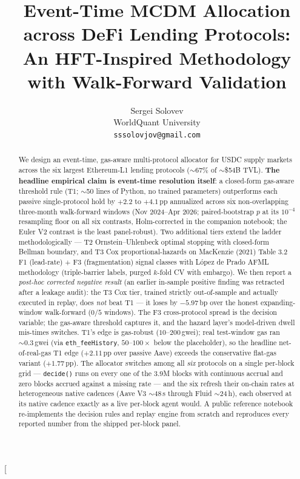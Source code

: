 \documentclass[twocolumn, 10pt]{article}
\title[english]{Event-Time MCDM Allocation across DeFi Lending Protocols:\\
       An HFT-Inspired Methodology with Walk-Forward Validation}
\author[english]{
Sergei Solovev \\
WorldQuant University \\
\texttt{sssolovjov@gmail.com} \\
}
\begin{document}
\twocolumn[
\maketitle
\begin{abstract}
We design an event-time, gas-aware multi-protocol allocator for USDC supply markets across the six largest Ethereum-L1 lending protocols ($\sim$67\% of $\sim$\$54B TVL).  \textbf{The headline empirical claim is event-time resolution itself}: a closed-form gas-aware threshold rule (T1; $\sim$50 lines of Python, no trained parameters) outperforms each passive single-protocol hold by $+2.2$ to $+4.1$\,pp annualized across six non-overlapping three-month walk-forward windows (Nov 2024--Apr 2026; paired-bootstrap $p$ at its $10^{-4}$ resampling floor on all six contrasts, Holm-corrected in the companion notebook; the Euler V2 contrast is the least panel-robust).  Two additional tiers extend the ladder methodologically --- T2 Ornstein--Uhlenbeck optimal stopping with closed-form Bellman boundary, and T3 Cox proportional-hazards on MacKenzie (2021) Table 3.2 F1 (lead-rate) $+$ F3 (fragmentation) signal classes with L\'opez de Prado AFML methodology (triple-barrier labels, purged $k$-fold CV with embargo).  We then report a \emph{post-hoc corrected negative result} (an earlier in-sample positive finding was retracted after a leakage audit): the T3 Cox tier, trained strictly out-of-sample and actually executed in replay, does \emph{not} beat T1 --- it loses by $-5.97$\,bp over the honest expanding-window walk-forward ($0/5$ windows).  The F3 cross-protocol spread is the decision variable; the gas-aware threshold captures it, and the hazard layer's model-driven dwell mis-times switches.  T1's edge is gas-robust ($10$--$200$\,gwei); real test-window gas ran $\sim 0.3$\,gwei (via \texttt{eth\_feeHistory}, $50$--$100\times$ below the placeholder), so the headline net-of-real-gas T1 edge ($+2.11$\,pp over passive Aave) exceeds the conservative flat-gas variant ($+1.77$\,pp).  The allocator switches among all \emph{six} protocols on a single per-block grid --- \texttt{decide()} runs on every one of the $3.9$M blocks with continuous accrual and zero blocks accrued against a missing rate --- and the six refresh their on-chain rates at heterogeneous native cadences (Aave V3 $\sim$48\,s through Fluid $\sim$24\,h), each observed at its native cadence exactly as a live per-block agent would.  A public reference notebook re-implements the decision rules and replay engine from scratch and reproduces every reported number from the shipped per-block panel.
\end{abstract}
\end{document}
